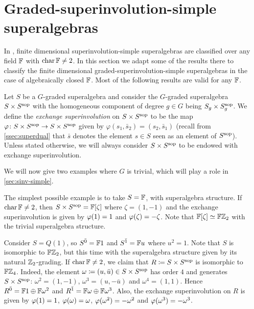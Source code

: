 \section{Graded-superinvolution-simple superalgebras}\label{grd-sinv-simple}

In \cite{racine}, finite dimensional superinvolution-simple superalgebras are classified over any field $\mathbb{F}$ with $\operatorname{char} \mathbb{F} \neq 2$. 
In this section we adapt some of the results there to classify the finite dimensional graded-superinvolution-simple superalgebras in the case of algebraically closed $\mathbb{F}$. 
Most of the following results are valid for any $\mathbb{F}$. 

\begin{defi}\label{def:SxSsop}
	Let $S$ be a $G$-graded superalgebra and consider the $G$-graded superalgebra $S \times S^{\mathrm{sop}}$ with the homogeneous component of degree $g\in G$ being $S_g \times S^{\mathrm{sop}}_g$. 
	We define the \emph{exchange superinvolution} on $S \times S^{\mathrm{sop}}$ to be the map $\varphi\colon S \times S^{\mathrm{sop}} \to S \times S^{\mathrm{sop}}$ given by $\varphi (s_1, \bar s_2) = (s_2, \bar s_1)$ (recall from \cref{ssec:superdual} that $\bar s$ denotes the element $s \in S$ seen as an element of $S^{\mathrm{sop}}$). 
	Unless stated otherwise, we will always consider $S \times S^{\mathrm{sop}}$ to be endowed with exchange superinvolution. 
\end{defi}

We will now give two examples where $G$ is trivial, which will play a role in \cref{sec:sinv-simple}. 

\begin{ex}\label{ex:FxF-iso-FZ2}
	The simplest possible example is to take $S = \mathbb{F}$, with superalgebra structure. 
	If $\operatorname{char} \mathbb{F} \neq 2$, then $S\times S^{\mathrm{sop}} = \mathbb{F} [\zeta]$ where $\zeta = (1, -1)$ and the exchange superinvolution is given by $\varphi(1) = 1$ and $\varphi(\zeta) = -\zeta$.
	Note that $\mathbb{F} [\zeta] \simeq \mathbb{F}\mathbb{Z}_2$ with the trivial superalgebra structure. 
\end{ex}

\begin{ex}\label{ex:FZ2xFZ2sop-iso-FZ4}
	Consider $S = Q(1)$, so $S^{\bar0} = \mathbb{F} 1$ and $S^{\bar1} = \mathbb{F} u$ where $u^2 =1$.
	Note that $S$ is isomorphic to $\mathbb{F}\mathbb{Z}_2$, but this time with the superalgebra structure given by its natural $\mathbb{Z}_2$-grading. 
	If $\operatorname{char} \mathbb{F} \neq 2$, we claim that $R \coloneqq S\times S^{\mathrm{sop}}$ is isomorphic to $\mathbb{F}\mathbb{Z}_4$.
	Indeed, the element $\omega \coloneqq (u, \bar u) \in S\times S^{\mathrm{sop}}$ has order $4$ and generates $S\times S^{\mathrm{sop}}$: $\omega^2 = (1, - 1)$, $\omega^3 = (u, - \bar u)$ and $\omega^4 = (1, 1)$.
	Hence $R^{\bar0} = \mathbb{F}1 \oplus \mathbb{F} \omega^2$ and $R^{\bar1} = \mathbb{F} \omega \oplus \mathbb{F} \omega^3$.
	Also, the exchange superinvolution on $R$ is given by $\varphi(1) = 1$, $\varphi(\omega) = \omega$, $\varphi(\omega^2) = -\omega^2$ and $\varphi(\omega^3) = -\omega^3$.
\end{ex}

